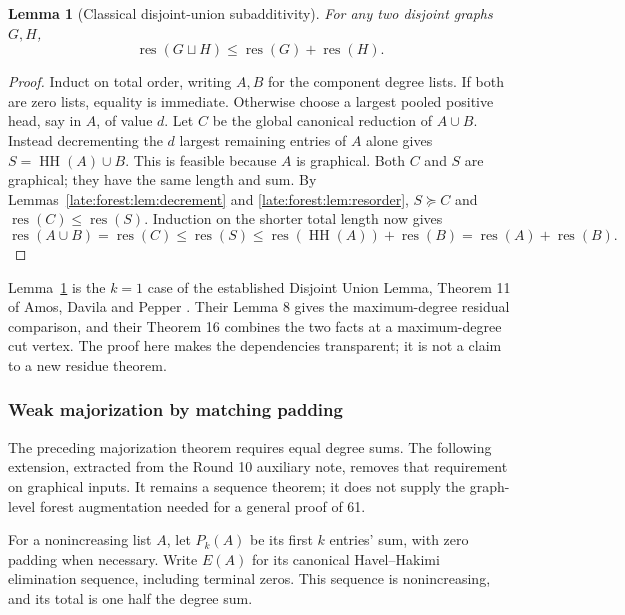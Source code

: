 \documentclass[11pt,a4paper]{article}
\newtheorem{lemma}[theorem]{Lemma}
\theoremstyle{definition}\newtheorem{definition}[theorem]{Definition}
\theoremstyle{remark}\newtheorem{remark}[theorem]{Remark}
\newcommand{\res}{\operatorname{res}}
\begin{document}
\begin{lemma}[Classical disjoint-union subadditivity]\label{late:forest:lem:union}
For any two disjoint graphs $G,H$,
\[
\res(G\sqcup H)\le \res(G)+\res(H).
\]
\end{lemma}
\begin{proof}
Induct on total order, writing $A,B$ for the component degree lists. If both
are zero lists, equality is immediate. Otherwise choose a largest pooled
positive head, say in $A$, of value $d$. Let $C$ be the global canonical
reduction of $A\cup B$. Instead decrementing the $d$ largest remaining
entries of $A$ alone gives $S=\operatorname{HH}(A)\cup B$. This is feasible because $A$ is
graphical. Both $C$ and $S$ are graphical; they have the same length and sum.
By Lemmas~\ref{late:forest:lem:decrement} and \ref{late:forest:lem:resorder}, $S\succeq C$ and
$\res(C)\le \res(S)$. Induction on the shorter total length now gives
\[
\res(A\cup B)=\res(C)\le \res(S)
\le \res(\operatorname{HH}(A))+\res(B)=\res(A)+\res(B).
\]
\end{proof}

Lemma~\ref{late:forest:lem:union} is the $k=1$ case of the established Disjoint Union
Lemma, Theorem 11 of Amos, Davila and Pepper \cite{late:forest:ADP}. Their Lemma 8 gives
the maximum-degree residual comparison, and their Theorem 16 combines the two
facts at a maximum-degree cut vertex. The proof here makes the dependencies
transparent; it is not a claim to a new residue theorem.

\subsubsection{Weak majorization by matching padding}
The preceding majorization theorem requires equal degree sums. The
following extension, extracted from the Round 10 auxiliary note, removes
that requirement on graphical inputs. It remains a sequence theorem;
it does not supply the graph-level forest augmentation needed for a
general proof of 61.

For a nonincreasing list $A$, let $P_k(A)$ be its first $k$ entries'
sum, with zero padding when necessary. Write $E(A)$ for its canonical
Havel--Hakimi elimination sequence, including terminal zeros. This
sequence is nonincreasing, and its total is one half the degree sum.
\end{document}
